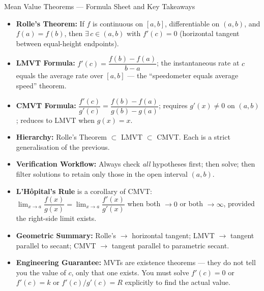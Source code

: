 \documentclass[12pt,a4paper]{article}
\begin{document}
\begin{learnbox}{Mean Value Theorems --- Formula Sheet and Key Takeaways}
\begin{itemize}
  \item \textbf{Rolle's Theorem:} If $f$ is continuous on $[a,b]$, differentiable on $(a,b)$,
        and $f(a)=f(b)$, then $\exists\, c \in (a,b)$ with $f'(c)=0$
        (horizontal tangent between equal-height endpoints).
  \item \textbf{LMVT Formula:} $f'(c) = \dfrac{f(b)-f(a)}{b-a}$; the instantaneous rate at $c$
        equals the average rate over $[a,b]$ --- the ``speedometer equals average speed'' theorem.
  \item \textbf{CMVT Formula:} $\dfrac{f'(c)}{g'(c)} = \dfrac{f(b)-f(a)}{g(b)-g(a)}$;
        requires $g'(x)\neq 0$ on $(a,b)$; reduces to LMVT when $g(x)=x$.
  \item \textbf{Hierarchy:} Rolle's Theorem $\subset$ LMVT $\subset$ CMVT.
        Each is a strict generalisation of the previous.
  \item \textbf{Verification Workflow:} Always check \emph{all} hypotheses first; then solve;
        then filter solutions to retain only those in the open interval $(a,b)$.
  \item \textbf{L'H\^{o}pital's Rule} is a corollary of CMVT:
        $\lim_{x\to a}\dfrac{f(x)}{g(x)} = \lim_{x\to a}\dfrac{f'(x)}{g'(x)}$
        when both $\to 0$ or both $\to \infty$, provided the right-side limit exists.
  \item \textbf{Geometric Summary:} Rolle's $\to$ horizontal tangent;
        LMVT $\to$ tangent parallel to secant;
        CMVT $\to$ tangent parallel to parametric secant.
  \item \textbf{Engineering Guarantee:} MVTs are existence theorems --- they do not tell you
        the value of $c$, only that one exists. You must solve $f'(c)=0$ or $f'(c)=k$ or
        $f'(c)/g'(c)=R$ explicitly to find the actual value.
\end{itemize}
\end{learnbox}
\end{document}
